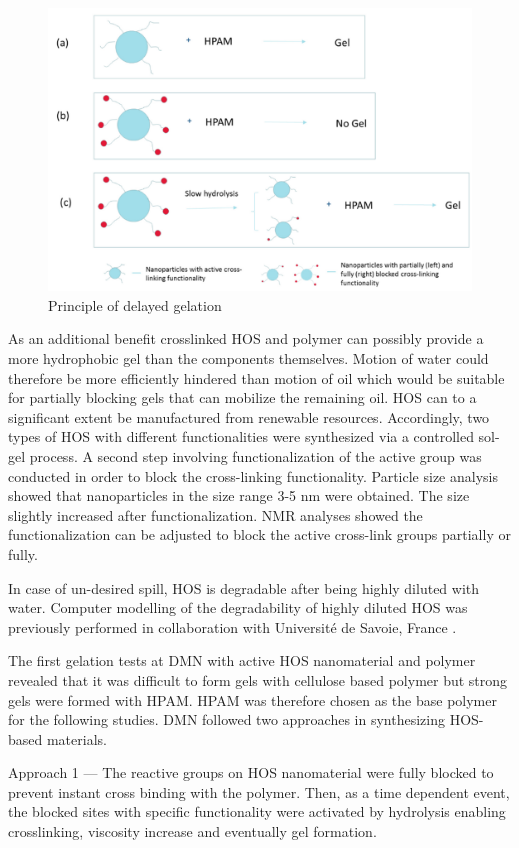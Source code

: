 \documentclass[energies,article,submit,moreauthors,pdftex]{Definitions/mdpi}
\begin{document}
\begin{figure}[h!]
    \centering
    \includegraphics[width=.8\textwidth]{fig/twoApproaches.png}
    \caption{Principle of delayed gelation \citep{Najafiazar2016}}
    \label{fig:twoApproaches}
\end{figure}

As an additional benefit crosslinked HOS and polymer can possibly provide a more hydrophobic gel than the components themselves. Motion of water could therefore be more efficiently hindered than motion of oil which would be suitable for partially blocking gels that can mobilize the remaining oil. HOS can to a significant extent be manufactured from renewable resources. Accordingly, two types of HOS with different functionalities were synthesized via a controlled sol-gel process. A second step involving functionalization of the active group was conducted in order to block the cross-linking functionality. Particle size analysis showed that nanoparticles in the size range 3-5 nm were obtained. The size slightly increased after functionalization. NMR analyses showed the functionalization can be adjusted to block the active cross-link groups partially or fully. 

In case of un-desired spill, HOS is degradable after being highly diluted with water. Computer modelling of the degradability of highly diluted HOS was previously performed in collaboration with Université de Savoie, France \citep{Neyertz2012,Neyertz2013}.

The first gelation tests at DMN with active HOS nanomaterial and polymer revealed that it was difficult to form gels with cellulose based polymer but strong gels were formed with HPAM. HPAM was therefore chosen as the base polymer for the following studies. DMN followed two approaches in synthesizing HOS-based materials.
    
    Approach 1 --- The reactive groups on HOS nanomaterial were fully blocked to prevent instant cross binding with the polymer. Then, as a time dependent event, the blocked sites with specific functionality were activated by hydrolysis enabling crosslinking, viscosity increase and eventually gel formation. 
    
\end{document}
